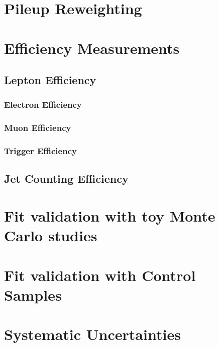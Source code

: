 \documentclass{cmspaper}
\begin{document}
\section{Pileup Reweighting}
     \label{sec:pileupReweighting}
     

\section{Efficiency Measurements}
     \label{sec:alleff}
     \subsection{Lepton Efficiency}
       \label{sec:efficiency}
       
     \subsubsection{Electron Efficiency}
       \label{sec:eff_electron}
       
     \subsubsection{Muon Efficiency}
       \label{sec:eff_muon}
       
     \subsubsection{Trigger Efficiency}
       \label{sec:eff_trigger}
       
     \subsection{Jet Counting Efficiency}
       

\clearpage
\section{Fit validation with toy Monte Carlo studies}
   \label{sec:fittoys}
   

\clearpage
\section{Fit validation with Control Samples}
   \label{sec:fitvalidation}
   

\clearpage
\section{Systematic Uncertainties}
   \label{sec:systematics}
   
\end{document}
